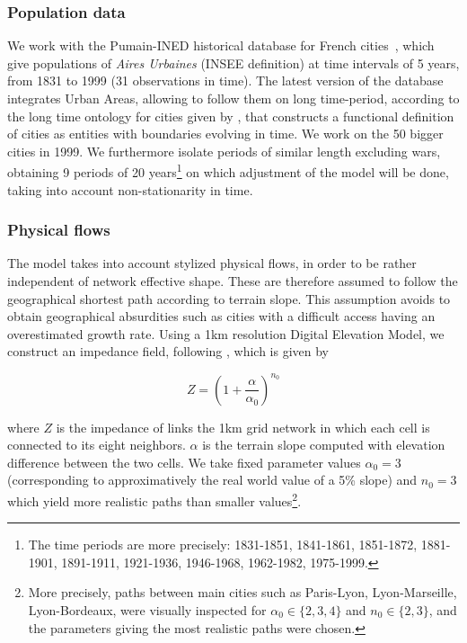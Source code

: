 \documentclass[Royal,sageh,times]{sagej}
\begin{document}
\subsubsection*{Population data}

We work with the Pumain-INED historical database for French cities~\citep{pumain1986fichier}, which give populations of \emph{Aires Urbaines} (INSEE definition) at time intervals of 5 years, from 1831 to 1999 (31 observations in time). The latest version of the database integrates Urban Areas, allowing to follow them on long time-period, according to the long time ontology for cities given by \cite{bretagnolle:tel-00459720}, that constructs a functional definition of cities as entities with boundaries evolving in time. We work on the 50 bigger cities in 1999. We furthermore isolate periods of similar length excluding wars, obtaining 9 periods of 20 years\footnote{The time periods are more precisely: 1831-1851, 1841-1861, 1851-1872, 1881-1901, 1891-1911, 1921-1936, 1946-1968, 1962-1982, 1975-1999.} on which adjustment of the model will be done, taking into account non-stationarity in time.


\subsubsection*{Physical flows}


The model takes into account stylized physical flows, in order to be rather independent of network effective shape. These are therefore assumed to follow the geographical shortest path according to terrain slope. This assumption avoids to obtain geographical absurdities such as cities with a difficult access having an overestimated growth rate. Using a 1km resolution Digital Elevation Model, we construct an impedance field, following \cite{collischonn2000direction}, which is given by

\[
Z = \left(1 + \frac{\alpha}{\alpha_0}\right)^{n_0}
\]

where $Z$ is the impedance of links the 1km grid network in which each cell is connected to its eight neighbors. $\alpha$ is the terrain slope computed with elevation difference between the two cells. We take fixed parameter values $\alpha_0 = 3$ (corresponding to approximatively the real world value of a 5\% slope) and $n_0 = 3$ which yield more realistic paths than smaller values\footnote{More precisely, paths between main cities such as Paris-Lyon, Lyon-Marseille, Lyon-Bordeaux, were visually inspected for $\alpha_0 \in \{2,3,4\}$ and $n_0 \in \{2,3\}$, and the parameters giving the most realistic paths were chosen.}.
\end{document}
